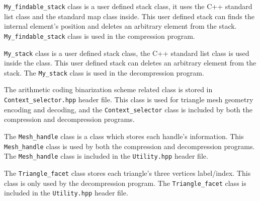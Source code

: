 \documentclass[onecolumn, 12pt]{article}
\begin{document}



\vspace{0.7em}
{\setlength\parindent{0pt}
\lstinline!My_findable_stack! class is a user defined stack class, it uses the C++ standard list class and the standard map class inside. This user defined stack can finds the internal element's position and deletes an arbitrary element from the stack. \lstinline!My_findable_stack! class is used in the compression program.

\lstinline!My_stack! class is a user defined stack class, the C++ standard list class is used inside the class. This user defined stack can deletes an arbitrary element from the stack. The \lstinline!My_stack! class is used in the decompression program.\vspace{0.5em}}




\vspace{0.7em}
{\setlength\parindent{0pt}
The arithmetic coding binarization scheme related class is stored in \lstinline!Context_selector.hpp! header file. This class is used for triangle mesh geometry encoding and decoding, and the \lstinline!Context_selector! class is included by both the compression and decompression programs.\vspace{0.5em}}




\vspace{0.7em}
{\setlength\parindent{0pt}
The \lstinline!Mesh_handle! class is a class which stores each handle's information. This \lstinline!Mesh_handle! class is used by both the compression and decompression programs. The \lstinline!Mesh_handle! class is included in the \lstinline!Utility.hpp! header file. \vspace{0.5em}}

\vspace{0.7em}
{\setlength\parindent{0pt}
The \lstinline!Triangle_facet! class stores each triangle's three vertices label/index. This class is only used by the decompression program. The \lstinline!Triangle_facet! class is included in the \lstinline!Utility.hpp! header file.\vspace{0.5em}}
\end{document}
